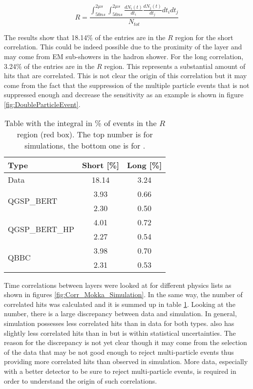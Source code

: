 \begin{equation}
	R = \frac{\int_{50 ns}^{2 \mu s} \int_{50 ns}^{2 \mu s} \frac{dN_i(t)}{dt_i} \frac{dN_j(t)}{dt_j} dt_i dt_j}{N_{tot}}
\end{equation}

The results show that 18.14\% of the entries are in the $R$ region for the short correlation. This could be indeed possible due to the proximity of the layer and may come from EM sub-showers in the hadron shower. For the long correlation, 3.24\% of the entries are in the $R$ region. This represents a substantial amount of hits that are correlated. This is not clear the origin of this correlation but it may come from the fact that the suppression of the multiple particle events that is not suppressed enough and decrease the sensitivity as an example is shown in figure \ref{fig:DoubleParticleEvent}.

\begin{table}[htb!]
	\centering
	\renewcommand*{\arraystretch}{1.3}
	\caption{Table with the integral in \% of events in the $R$ region (red box). The top number is for \mokka simulations, the bottom one is for \ddhep.}
	\label{table:Correlation_DataSim}
	\begin{tabular}{@{} |p{5cm}|cc| @{}}
		\hline
		Type & Short [\%] & Long [\%]\\
		\hline
		\multirow{2}{*}{Data} & \multirow{2}{*}{18.14} & \multirow{2}{*}{3.24}\\ & &\\
		\hline
		\multirow{2}{*}{QGSP\_BERT} & 3.93 & 0.66\\ & 2.30 & 0.50\\
		\hline
		\multirow{2}{*}{QGSP\_BERT\_HP} & 4.01 & 0.72\\ & 2.27 & 0.54\\
		\hline
		\multirow{2}{*}{QBBC} & 3.98 & 0.70\\ & 2.31 & 0.53\\
		\hline
	\end{tabular}
\end{table}

Time correlations between layers were looked at for different physics lists as shown in figures \ref{fig:Corr_Mokka_Simulation}. In the same way, the number of correlated hits was calculated and it is summed up in table \ref{table:Correlation_DataSim}. Looking at the number, there is a large discrepancy between data and simulation. In general, simulation possesses less correlated hits than in data for both types. \ddhep also has slightly less correlated hits than in \mokka but is within statistical uncertainties. The reason for the discrepancy is not yet clear though it may come from the selection of the data that may be not good enough to reject multi-particle events thus providing more correlated hits than observed in simulation. More data, especially with a better detector to be sure to reject multi-particle events, is required in order to understand the origin of such correlations.

